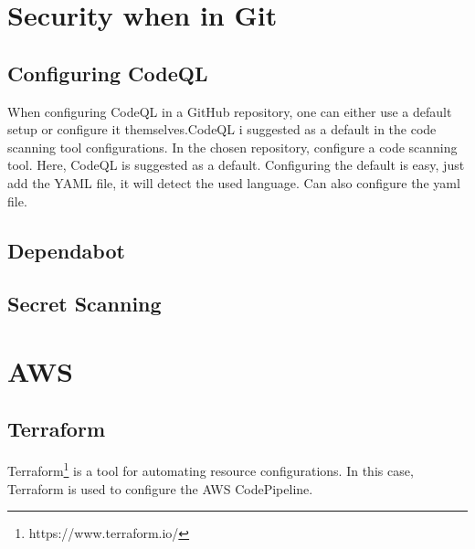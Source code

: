 \section{Security when in Git}

\subsection{Configuring CodeQL}
When configuring CodeQL in a GitHub repository, one can either use a default setup or configure it themselves.CodeQL i suggested as a default in the code scanning tool configurations.
In the chosen repository, configure a code scanning tool. Here, CodeQL is suggested as a default. Configuring the default is easy, just add the YAML file, it will detect the used language. Can also configure the yaml file. 

\subsection{Dependabot}

\subsection{Secret Scanning}


\section{AWS}
\subsection{Terraform}
Terraform\footnote{https://www.terraform.io/} is a tool for automating resource configurations. In this case, Terraform is used to configure the AWS CodePipeline. \\
\newpage

